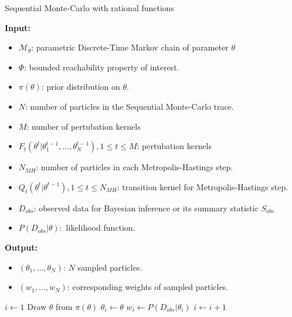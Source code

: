 \begin{algorithm}[H]
    \caption{Sequential Monte-Carlo with rational functions}
    \label{rf-smc-alg}
    \hspace*{\algorithmicindent} \textbf{Input:}
    \begin{itemize}
        \item $\mathcal{M}_\theta$: parametric Discrete-Time Markov chain of parameter $\theta$
        \item $\Phi$: bounded reachability property of interest.
        \item $\pi(\theta)$: prior distribution on $\theta$.
        \item $N$: number of particles in the Sequential Monte-Carlo trace.
        \item $M$: number of pertubation kernels
        \item $F_t(\theta^t | \theta^{t-1}_1,\ldots,\theta^{t-1}_N), 1\leq t \leq M$: pertubation kernels
        \item $N_{MH}$: number of particles in each Metropolis-Hastings step.
        \item $Q_t(\theta^t|\theta^{t-1}), 1 \leq t \leq N_{MH}$: transition kernel for Metropolis-Hastings step.
        \item $D_{obs}$: observed data for Bayesian inference or its summary statistic $S_{obs}$
        \item $P(D_{obs}|\theta):$ likelihood function.
    \end{itemize}
    \hspace*{\algorithmicindent} \textbf{Output:}
    \begin{itemize}
        \item $(\theta_1,\ldots,\theta_N)$: $N$ sampled particles.
        \item $(w_1,\ldots,w_N)$: corresponding weights of sampled particles.
    \end{itemize}
    \begin{algorithmic}[1]
        \State $i \leftarrow 1$
         
        \State Draw $\theta$ from $\pi(\theta)$
        \State $\theta_i \leftarrow \theta$
        \State $w_i \leftarrow P(D_{obs}|\theta_i)$
        \State $i \leftarrow i + 1$
        \EndWhile
    \end{algorithmic}
\end{algorithm}


